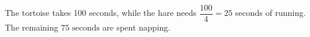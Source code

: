 The tortoise takes 100 seconds, while the hare needs $\dfrac{100}{4}=25$ seconds of running. The remaining $\boxed{75\text{ seconds}}$ are spent napping.
